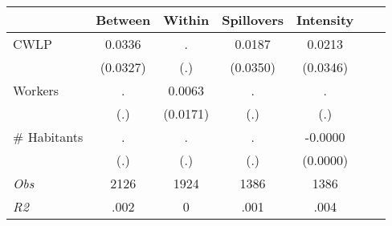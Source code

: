 \begin{tabular}{l*{6}{c}}\hline&\multicolumn{1}{c}{Between}&\multicolumn{1}{c}{Within}&\multicolumn{1}{c}{Spillovers}&\multicolumn{1}{c}{Intensity}\\ \hline 
CWLP & 0.0336 & . & 0.0187 & 0.0213 \\
 & (0.0327) & (.) & (0.0350) & (0.0346) \\
Workers & . & 0.0063 & . & . \\
 & (.) & (0.0171) & (.) & (.) \\
\# Habitants & . & . & . & -0.0000 \\
  & (.) & (.) & (.) & (0.0000) \\
\hline \textit{Obs} & 2126 & 1924 & 1386 & 1386  \\ \textit{R2} & .002 & 0 & .001 & .004 \\ \hline \end{tabular}
